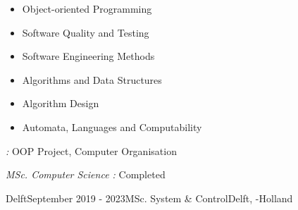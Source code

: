 \begin{rSection}{}
  \begin{center}
  \begin{minipage}{0.45\textwidth}
  \begin{itemize}
    \item Object-oriented Programming\\[-3ex]
    \item Software Quality and Testing\\[-3ex]
    \item Software Engineering Methods\\[-3ex]
  \end{itemize}
  \end{minipage}
  \begin{minipage}{0.45\textwidth}
  \begin{itemize}
    \item Algorithms and Data Structures\\[-3ex]
    \item Algorithm Design\\[-3ex]
    \item Automata, Languages and Computability\\[-3ex]
  \end{itemize}
  \end{minipage}
  \end{center}
  \vspace{0.3cm}

  \textit{:}\hspace{0.2cm} OOP Project, Computer Organisation\\
  \vspace{-0.5cm}

  \noindent\textit{ MSc. Computer Science :}\hspace{0.2cm} Completed

  \begin{experienceItem}
    { Delft}{September 2019 -  2023}{MSc. System \& Control}{Delft, -Holland}
  \end{experienceItem}


\end{rSection}
